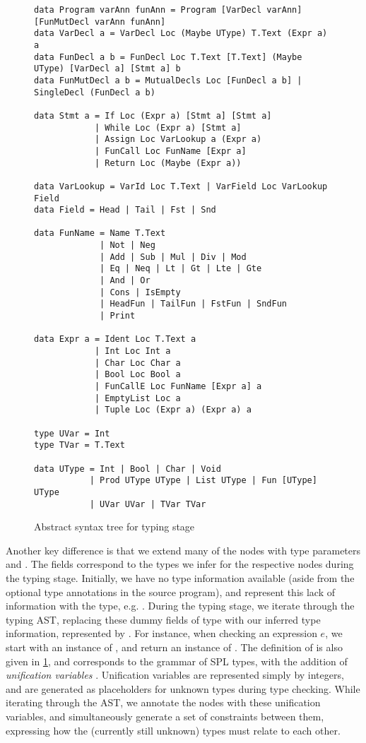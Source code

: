 \begin{figure}
\begin{verbatim}
data Program varAnn funAnn = Program [VarDecl varAnn] [FunMutDecl varAnn funAnn]
data VarDecl a = VarDecl Loc (Maybe UType) T.Text (Expr a) a
data FunDecl a b = FunDecl Loc T.Text [T.Text] (Maybe UType) [VarDecl a] [Stmt a] b
data FunMutDecl a b = MutualDecls Loc [FunDecl a b] | SingleDecl (FunDecl a b)

data Stmt a = If Loc (Expr a) [Stmt a] [Stmt a]
            | While Loc (Expr a) [Stmt a]
            | Assign Loc VarLookup a (Expr a)
            | FunCall Loc FunName [Expr a]
            | Return Loc (Maybe (Expr a))

data VarLookup = VarId Loc T.Text | VarField Loc VarLookup Field
data Field = Head | Tail | Fst | Snd

data FunName = Name T.Text
             | Not | Neg
             | Add | Sub | Mul | Div | Mod
             | Eq | Neq | Lt | Gt | Lte | Gte
             | And | Or
             | Cons | IsEmpty
             | HeadFun | TailFun | FstFun | SndFun
             | Print

data Expr a = Ident Loc T.Text a
            | Int Loc Int a
            | Char Loc Char a
            | Bool Loc Bool a
            | FunCallE Loc FunName [Expr a] a
            | EmptyList Loc a
            | Tuple Loc (Expr a) (Expr a) a

type UVar = Int
type TVar = T.Text

data UType = Int | Bool | Char | Void
           | Prod UType UType | List UType | Fun [UType] UType
           | UVar UVar | TVar TVar
\end{verbatim}

\caption{Abstract syntax tree for typing stage}
\label{fig:type-ast}
\end{figure}

Another key difference is that we extend many of the nodes with type
parameters  and . The fields correspond to the types we
infer for the respective nodes during the typing stage.
Initially, we have no type information available (aside from the optional type
annotations in the source program), and represent this lack of information
with the \haskell{()} type, e.g. . During the typing stage, we
iterate through the typing AST, replacing these dummy fields of type \haskell{()}
with our inferred type information, represented by .
For instance, when checking an expression $e$, we start with an instance of
, and return an instance of .
The definition of  is also given in \cref{fig:type-ast}, and
corresponds to the grammar of SPL types, with the addition of \emph{unification
variables} .
Unification variables are represented simply by integers, and are generated as
placeholders for unknown types during type checking. While iterating through the
AST, we annotate the nodes with these unification variables, and simultaneously
generate a set of constraints between them, expressing how the (currently still
unknown) types must relate to each other.

